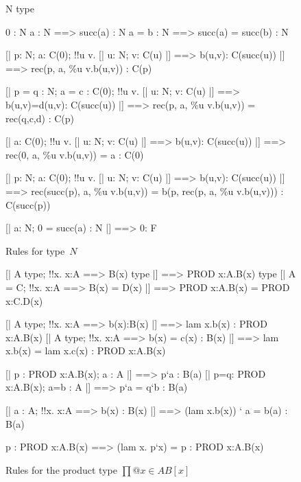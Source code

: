 \begin{figure} 
\begin{ttbox}
        N type

       0 : N
   a : N ==> succ(a) : N
  a = b : N ==> succ(a) = succ(b) : N

        [| p: N;  a: C(0);  
             !!u v. [| u: N; v: C(u) |] ==> b(u,v): C(succ(u)) 
          |] ==> rec(p, a, \%u v.b(u,v)) : C(p)

       [| p = q : N;  a = c : C(0);  
             !!u v. [| u: N; v: C(u) |] ==> b(u,v)=d(u,v): C(succ(u))
          |] ==> rec(p, a, \%u v.b(u,v)) = rec(q,c,d) : C(p)

       [| a: C(0);  
             !!u v. [| u: N; v: C(u) |] ==> b(u,v): C(succ(u))
          |] ==> rec(0, a, \%u v.b(u,v)) = a : C(0)

   [| p: N;  a: C(0);  
             !!u v. [| u: N; v: C(u) |] ==> b(u,v): C(succ(u)) 
          |] ==> rec(succ(p), a, \%u v.b(u,v)) =
                 b(p, rec(p, a, \%u v.b(u,v))) : C(succ(p))

      [| a: N;  0 = succ(a) : N |] ==> 0: F
\end{ttbox}
\caption{Rules for type~$N$} \label{ctt-N}
\end{figure}


\begin{figure} 
\begin{ttbox}
     [| A type; !!x. x:A ==> B(x) type |] ==> PROD x:A.B(x) type
    [| A = C;  !!x. x:A ==> B(x) = D(x) |] ==> 
          PROD x:A.B(x) = PROD x:C.D(x)

     [| A type;  !!x. x:A ==> b(x):B(x)
          |] ==> lam x.b(x) : PROD x:A.B(x)
    [| A type;  !!x. x:A ==> b(x) = c(x) : B(x)
          |] ==> lam x.b(x) = lam x.c(x) : PROD x:A.B(x)

     [| p : PROD x:A.B(x);  a : A |] ==> p`a : B(a)
    [| p=q: PROD x:A.B(x);  a=b : A |] ==> p`a = q`b : B(a)

     [| a : A;  !!x. x:A ==> b(x) : B(x)
          |] ==> (lam x.b(x)) ` a = b(a) : B(a)

    p : PROD x:A.B(x) ==> (lam x. p`x) = p : PROD x:A.B(x)
\end{ttbox}
\caption{Rules for the product type $\prod@{x\in A}B[x]$} \label{ctt-prod}
\end{figure}


